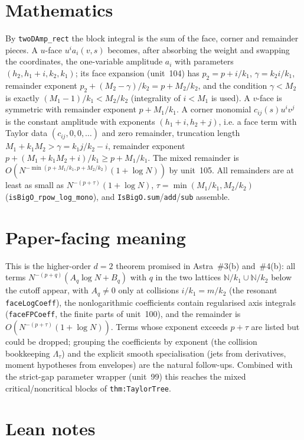 \documentclass[11pt]{article}
\begin{document}
\section{Mathematics}

By \texttt{twoDAmp\_rect} the block integral is the sum of the face, corner and remainder pieces.
A $u$-face $u^ia_i(v,s)$ becomes, after absorbing the weight and swapping the coordinates, the
one-variable amplitude $a_i$ with parameters $(h_2,h_1+i,k_2,k_1)$; its face expansion (unit~104)
has $p_2=p+i/k_1$, $\gamma=k_2i/k_1$, remainder exponent $p_2+(M_2-\gamma)/k_2=p+M_2/k_2$,
and the condition $\gamma<M_2$ is exactly $(M_1-1)/k_1<M_2/k_2$ (integrality of $i<M_1$ is used).
A $v$-face is symmetric with remainder exponent $p+M_1/k_1$. A corner monomial
$c_{ij}(s)u^iv^j$ is the constant amplitude with exponents $(h_1+i,h_2+j)$, i.e. a face term with
Taylor data $(c_{ij},0,0,\dots)$ and zero remainder, truncation length $M_1+k_1M_2>\gamma=k_1j/k_2-i$,
remainder exponent $p+(M_1+k_1M_2+i)/k_1\ge p+M_1/k_1$. The mixed remainder is
$O(N^{-\min(p+M_1/k_1,p+M_2/k_2)}(1+\log N))$ by unit~105. All remainders are at least as small as
$N^{-(p+\tau)}(1+\log N)$, $\tau=\min(M_1/k_1,M_2/k_2)$ (\texttt{isBigO\_rpow\_log\_mono}), and
\texttt{IsBigO.sum}/\texttt{add}/\texttt{sub} assemble.

\section{Paper-facing meaning}

This is the higher-order $d=2$ theorem promised in Astra~\#3(b) and~\#4(b): all terms
$N^{-(p+q)}(A_q\log N+B_q)$ with $q$ in the two lattices $\mathbb N/k_1\cup\mathbb N/k_2$ below the
cutoff appear, with $A_q\ne0$ only at collisions $i/k_1=m/k_2$ (the resonant
\texttt{faceLogCoeff}), the nonlogarithmic coefficients contain regularised axis integrals
(\texttt{faceFPCoeff}, the finite parts of unit~100), and the remainder is
$O(N^{-(p+\tau)}(1+\log N))$. Terms whose exponent exceeds $p+\tau$ are listed but could be dropped;
grouping the coefficients by exponent (the collision bookkeeping $\Lambda_\tau$) and the explicit
smooth specialisation (jets from derivatives, moment hypotheses from envelopes) are the natural
follow-ups. Combined with the strict-gap parameter wrapper (unit~99) this reaches the mixed
critical/noncritical blocks of \texttt{thm:TaylorTree}.

\section{Lean notes}
\end{document}
